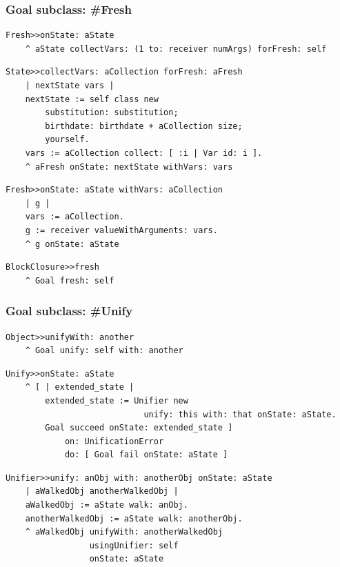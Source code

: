 \documentclass[9pt]{beamer}
\begin{document}
\begin{frame}[fragile]
\frametitle{Goal subclass: \#Fresh}
\begin{verbatim}
Fresh>>onState: aState
    ^ aState collectVars: (1 to: receiver numArgs) forFresh: self
\end{verbatim}
\begin{verbatim}
State>>collectVars: aCollection forFresh: aFresh
    | nextState vars |
    nextState := self class new
        substitution: substitution;
        birthdate: birthdate + aCollection size;
        yourself.
    vars := aCollection collect: [ :i | Var id: i ].
    ^ aFresh onState: nextState withVars: vars
\end{verbatim}
\begin{verbatim}
Fresh>>onState: aState withVars: aCollection
    | g |
    vars := aCollection.
    g := receiver valueWithArguments: vars.
    ^ g onState: aState
\end{verbatim}
\begin{verbatim}
BlockClosure>>fresh
    ^ Goal fresh: self
\end{verbatim}
\end{frame}


\begin{frame}[fragile]
\frametitle{Goal subclass: \#Unify}
\begin{verbatim}
Object>>unifyWith: another
    ^ Goal unify: self with: another
\end{verbatim}
\begin{verbatim}
Unify>>onState: aState
    ^ [ | extended_state |
        extended_state := Unifier new
                            unify: this with: that onState: aState.
        Goal succeed onState: extended_state ]
            on: UnificationError
            do: [ Goal fail onState: aState ]
\end{verbatim}
\begin{verbatim}
Unifier>>unify: anObj with: anotherObj onState: aState
    | aWalkedObj anotherWalkedObj |
    aWalkedObj := aState walk: anObj.
    anotherWalkedObj := aState walk: anotherObj.
    ^ aWalkedObj unifyWith: anotherWalkedObj
                 usingUnifier: self
                 onState: aState
\end{verbatim}
\end{frame}
\end{document}
